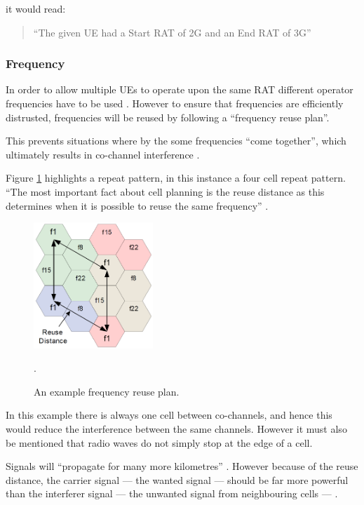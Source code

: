 it would read:

\begin{quote}
  ``The given UE had a Start RAT of 2G and an End RAT of 3G''
\end{quote}


\subsubsection{Frequency}
In order to allow multiple UEs to operate upon the same RAT different 
operator frequencies have to be used \citep{cox08}. However to ensure that 
frequencies are efficiently distrusted, frequencies will be reused by following
a ``frequency reuse plan''. 

This prevents situations where by the some frequencies ``come together'', which
ultimately results in co-channel interference \citep{mpirical10}.

Figure \ref{fig:frequencyReuse} highlights a repeat pattern, in this instance 
a four cell repeat pattern. ``The most important fact about cell planning is 
the reuse distance as this determines when it is possible to reuse the same 
frequency'' \citep{mpirical10}.

\begin{figure}[H]
  \centering
    \includegraphics[width=0.4\textwidth]{chapter3/mobile_networks/frequency_reuse.png}
  \caption{An example frequency reuse plan.}.
  \label{fig:frequencyReuse}
\end{figure}

In this example there is always one cell between co-channels, and hence this 
would reduce the interference between the same channels. However it must also 
be mentioned that radio waves do not simply stop at the edge of a cell. 

Signals will ``propagate for many more kilometres'' \citep{mpirical10}. However
because of the reuse distance, the carrier signal --- the wanted signal --- 
should be far more powerful than the interferer signal --- the unwanted signal 
from neighbouring cells --- \citep{mpirical10} .


